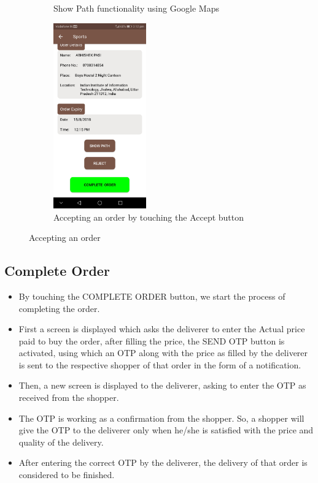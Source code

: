 \documentclass{report}
\begin{document}
\begin{figure}[h!]
\begin{subfigure}[h!]{.24\textwidth}
\caption{\centering Show Path functionality using Google Maps}
\end{subfigure}
\begin{subfigure}[h!]{.24\textwidth}
\centering
\includegraphics[width=4cm]{order_accepted.jpg}
\caption{\centering Accepting an order by touching the Accept button}
\end{subfigure}
\caption{Accepting an order} 
\label{fig:NASA_Logo}
\end{figure}


\subsection{Complete Order}
\begin{itemize}
\item By touching the COMPLETE ORDER button, we start the process of completing the order.
\item First a screen is displayed which asks the deliverer to enter the Actual price paid to buy the order, after filling the price, the SEND OTP button is activated, using which an OTP along with the price as filled by the deliverer is sent to the respective shopper of that order in the form  of a notification.
\item Then, a new screen is displayed to the deliverer, asking to enter the OTP as received from the shopper.
\item The OTP is working as a confirmation from the shopper. So, a shopper will give the OTP to the deliverer only when he/she is satisfied with the price and quality of the delivery.
\item After entering the correct OTP by the deliverer, the delivery of that order is considered to be finished.
\end{itemize}
\end{document}
